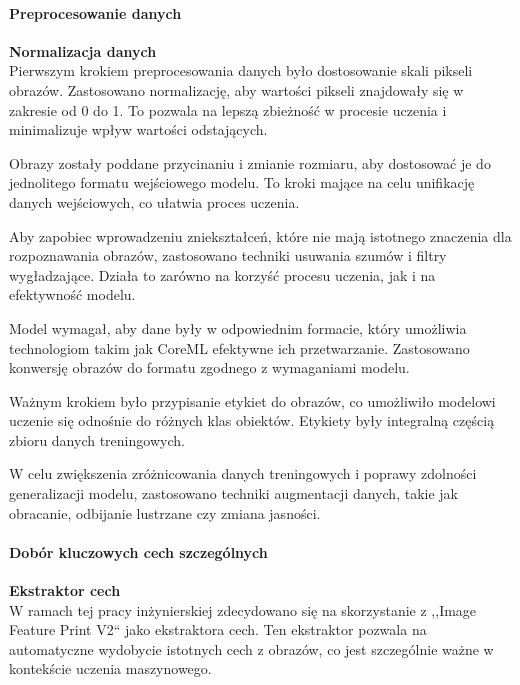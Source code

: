 \documentclass[12pt, a4paper, twoside, openany]{book}
\newcommand{\forceindent}{\leavevmode{\parindent=1.3em\indent}}
\begin{document}
\paragraph{Preprocesowanie danych\\}
\forceindent \textbf{ Normalizacja danych\\}
\indent Pierwszym krokiem preprocesowania danych było dostosowanie skali pikseli obrazów.
Zastosowano normalizację, aby wartości pikseli znajdowały się w zakresie od 0 do 1.
To pozwala na lepszą zbieżność w procesie uczenia i minimalizuje wpływ wartości odstających.

Obrazy zostały poddane przycinaniu i zmianie rozmiaru, aby dostosować je do jednolitego formatu wejściowego modelu.
To kroki mające na celu unifikację danych wejściowych, co ułatwia proces uczenia.

Aby zapobiec wprowadzeniu zniekształceń, które nie mają istotnego znaczenia dla rozpoznawania obrazów, zastosowano techniki usuwania szumów i filtry wygładzające.
Działa to zarówno na korzyść procesu uczenia, jak i na efektywność modelu.

Model wymagał, aby dane były w odpowiednim formacie, który umożliwia technologiom takim jak CoreML efektywne ich przetwarzanie.
Zastosowano konwersję obrazów do formatu zgodnego z wymaganiami modelu.

Ważnym krokiem było przypisanie etykiet do obrazów, co umożliwiło modelowi uczenie się odnośnie do różnych klas obiektów.
Etykiety były integralną częścią zbioru danych treningowych.

W celu zwiększenia zróżnicowania danych treningowych i poprawy zdolności generalizacji modelu, zastosowano techniki augmentacji danych, takie jak obracanie, odbijanie lustrzane czy zmiana jasności.

\paragraph{Dobór kluczowych cech szczególnych\\}
\forceindent \textbf{ Ekstraktor cech\\}
\indent W ramach tej pracy inżynierskiej zdecydowano się na skorzystanie z ,,Image Feature Print V2`` jako ekstraktora cech.
Ten ekstraktor pozwala na automatyczne wydobycie istotnych cech z obrazów, co jest szczególnie ważne w kontekście uczenia maszynowego.
\end{document}
